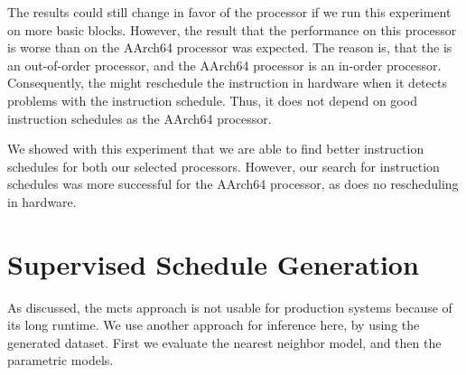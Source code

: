 The results could still change in favor of the \aurora processor if we run this experiment on more basic blocks.
However, the result that the performance on this processor is worse than on the AArch64 processor was expected.
The reason is, that the \aurora is an out-of-order processor, and the AArch64 processor is an in-order processor.
Consequently, the \aurora might reschedule the instruction in hardware when it detects problems with the instruction schedule.
Thus, it does not depend on good instruction schedules as the AArch64 processor.

We showed with this experiment that we are able to find better instruction schedules for both our selected processors.
However, our search for instruction schedules was more successful for the AArch64 processor, as does no rescheduling in hardware.

\section{Supervised Schedule Generation}
\label{sec:eval:supervised}
As discussed, the \ac{mcts} approach is not usable for production systems because of its long runtime.
We use another approach for inference here, by using the generated dataset.
First we evaluate the nearest neighbor model, and then the parametric models.

